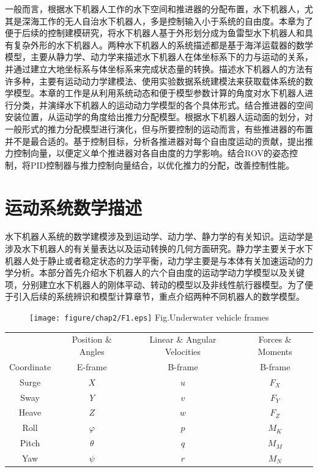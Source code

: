 一般而言，根据水下机器人工作的水下空间和推进器的分配布置，水下机器人，尤其是深海工作的无人自治水下机器人，多是控制输入小于系统的自由度。本章为了便于后续的控制建模研究，将水下机器人基于外形划分成为鱼雷型水下机器人和具有复杂外形的水下机器人。两种水下机器人的系统描述都是基于海洋运载器的数学模型，主要从静力学、动力学来描述水下机器人在体坐标系下的力与运动的关系，并通过建立大地坐标系与体坐标系来完成状态量的转换。描述水下机器人的方法有许多种，主要有运动动力学建模法、使用实验数据系统建模法来获取载体系统的数学模型。本章的工作是从利用系统动态和便于模型参数计算的角度对水下机器人进行分类，并演绎水下机器人的运动动力学模型的各个具体形式。结合推进器的空间安装位置，从运动学的角度给出推力分配模型。根据水下机器人运动面的划分，对一般形式的推力分配模型进行演化，但与所要控制的运动而言，有些推进器的布置并不是最合适的。基于控制目标，分析各推进器对每个自由度运动的贡献，提出推力控制向量，以便定义单个推进器对各自由度的力学影响。结合ROV的姿态控制，将PID控制器与推力控制向量结合，以优化推力的分配，改善控制性能。

\section{运动系统数学描述 }

水下机器人系统的数学建模涉及到运动学、动力学、静力学的有关知识。运动学是涉及水下机器人的有关量表达以及运动转换的几何方面研究。静力学主要关于水下机器人处于静止或者稳定状态的力学平衡，动力学主要是与本体有关加速运动的力学分析。本部分首先介绍水下机器人的六个自由度的运动学动力学模型以及关键项，分别建立水下机器人的刚体平动、转动的模型以及非线性航行器模型。为了便于引入后续的系统辨识和模型计算章节，重点介绍两种不同机器人的数学模型。

\begin{figure}[!htp]
\centering
\texttt{[image: figure/chap2/F1.eps]}
\label{fig:chap2:F1}
 {Fig.}{Underwater vehicle frames}
\end{figure}

\begin{table}[!hpb]
\centering
\label{tab:chap2:notation}
\begin{tabular}{cccc}
\toprule
      & Position \& Angles   &  Linear \& Angular Velocities  & Forces \& Moments \\
Coordinate & E-frame & B-frame & B-frame \\ \midrule
Surge & $X$      &  $u$ & $F_X$ \\
Sway  & $Y$      &  $v$ & $F_Y$ \\
Heave & $Z$      &  $w$ & $F_Z$ \\
Roll  & $\varphi$&  $p$ & $M_K$ \\
Pitch & $\theta$ &  $q$ & $M_M$ \\
Yaw   & $\psi$   &  $r$ & $M_N$ \\
\bottomrule
\end{tabular}
\end{table}

